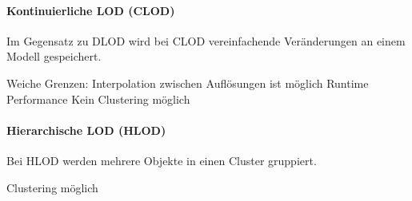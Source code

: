 \paragraph{Kontinuierliche LOD (CLOD)}
Im Gegensatz zu DLOD wird bei CLOD vereinfachende Veränderungen an einem Modell gespeichert.
\begin{itemize}
  \pro Weiche Grenzen: Interpolation zwischen Auflösungen ist möglich
  \con Runtime Performance
  \con Kein Clustering möglich
\end{itemize}

\paragraph{Hierarchische LOD (HLOD)}
Bei HLOD werden mehrere Objekte in einen Cluster gruppiert.
\begin{itemize}
  \pro Clustering möglich
\end{itemize}
